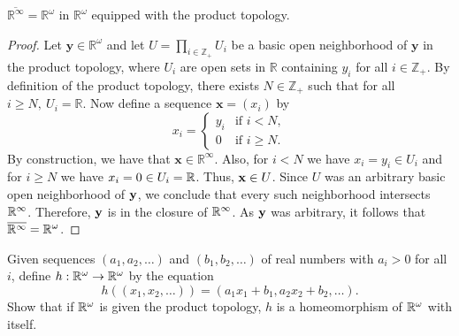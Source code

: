 \begin{solution}
      $\overline{\mathbb{R}^\infty} = \mathbb{R}^\omega$ in $\mathbb{R}^\omega$ equipped with the product topology.
    \begin{proof}
        Let $\mathbf{y} \in \mathbb{R}^\omega$ and let $U = \prod_{i\in\mathbb{Z}_+} U_i$ be a basic open neighborhood of $\mathbf{y}$ in the product topology, where $U_i$ are open sets in $\mathbb{R}$ containing $y_i$ for all $i \in \mathbb{Z}_+$.
        By definition of the product topology, there exists $N \in \mathbb{Z}_+$ such that for all $i \geq N,~ U_i = \mathbb{R}$.
        Now define a sequence $\mathbf{x} = (x_i)$ by
        \begin{equation*}
            x_i = \begin{cases}
                y_i & \text{if } i < N, \\
                0   & \text{if } i \geq N.
            \end{cases}
        \end{equation*}
        By construction, we have that $\mathbf{x} \in \mathbb{R}^\infty$.
        Also, for $i < N$ we have $x_i = y_i \in U_i$ and for $i \geq N$ we have $x_i = 0 \in U_i = \mathbb{R}$.
        Thus, $\mathbf{x} \in U$.
        Since $U$ was an arbitrary basic open neighborhood of $\mathbf{y}$, we conclude that every such neighborhood intersects $\mathbb{R}^\infty$.
        Therefore, $\mathbf{y}$ is in the closure of $\mathbb{R}^\infty$.
        As $\mathbf{y}$ was arbitrary, it follows that $\overline{\mathbb{R}^\infty} = \mathbb{R}^\omega$.
    \end{proof}
\end{solution}
\newpage

\begin{exercise}[ID=2.19.8]
    Given sequences $(a_1, a_2, \ldots)$ and $(b_1, b_2, \ldots)$ of real numbers with $a_i > 0$ for all $i$, define $h: \mathbb{R}^\omega \rightarrow \mathbb{R}^\omega$ by the equation
    \begin{equation*}
        h((x_1, x_2, \ldots)) = (a_1 x_1 + b_1, a_2 x_2 + b_2, \ldots).
    \end{equation*}
    Show that if $\mathbb{R}^\omega$ is given the product topology, $h$ is a homeomorphism of $\mathbb{R}^\omega$ with itself.
\end{exercise}

